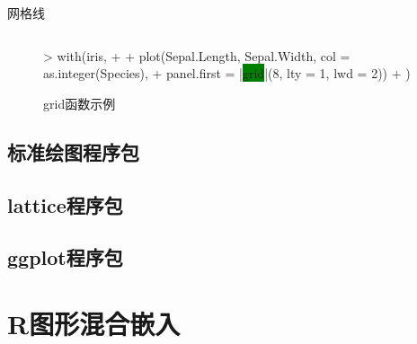 \documentclass{beamerthemeMono}
\begin{document}
\begin{frame}[t,fragile]{\subsecname}{网格线}
\begin{onlyenv}
\begin{figure}
\begin{columns}
    \begin{column}[c]{.6\textwidth}
\begin{rcode}
> with(iris,
+   {
+   plot(Sepal.Length, Sepal.Width, col = as.integer(Species),
+        panel.first = |\colorbox{green}{grid}|(8, lty = 1, lwd = 2))
+   })
\end{rcode}
    \end{column}
  \end{columns}
  \caption{grid函数示例}
\end{figure}
\end{onlyenv} 
\end{frame} 

\subsection{标准绘图程序包}

\subsection{lattice程序包}

\subsection{ggplot程序包}
\section{R图形混合嵌入}

\begin{frame}%
\end{frame}
\end{document}
